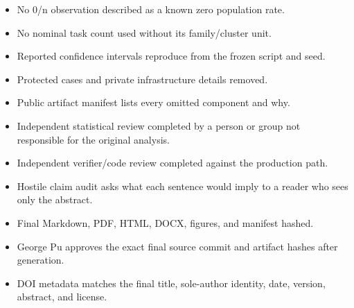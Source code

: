 \documentclass[
  9pt,
  letterpaper,
]{article}
\begin{document}
\begin{itemize}
  historical warning.
\item[$\square$]
  No 0/n observation described as a known zero population rate.
\item[$\square$]
  No nominal task count used without its family/cluster unit.
\item[$\square$]
  Reported confidence intervals reproduce from the frozen script and
  seed.
\item[$\square$]
  Protected cases and private infrastructure details removed.
\item[$\square$]
  Public artifact manifest lists every omitted component and why.
\item[$\square$]
  Independent statistical review completed by a person or group not
  responsible for the original analysis.
\item[$\square$]
  Independent verifier/code review completed against the production
  path.
\item[$\square$]
  Hostile claim audit asks what each sentence would imply to a reader
  who sees only the abstract.
\item[$\square$]
  Final Markdown, PDF, HTML, DOCX, figures, and manifest hashed.
\item[$\square$]
  George Pu approves the exact final source commit and artifact hashes
  after generation.
\item[$\square$]
  DOI metadata matches the final title, sole-author identity, date,
  version, abstract, and license.
\end{itemize}
\end{document}
